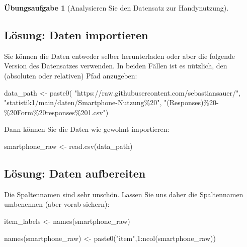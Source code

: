 \documentclass[
  letterpaper,
]{scrbook}
\newenvironment{Shaded}{\begin{snugshade}}{\end{snugshade}}
\newcommand{\DecValTok}[1]{\textcolor[rgb]{0.68,0.00,0.00}{#1}}
\newcommand{\FunctionTok}[1]{\textcolor[rgb]{0.28,0.35,0.67}{#1}}
\newcommand{\NormalTok}[1]{\textcolor[rgb]{0.00,0.23,0.31}{#1}}
\newcommand{\OtherTok}[1]{\textcolor[rgb]{0.00,0.23,0.31}{#1}}
\newcommand{\SpecialCharTok}[1]{\textcolor[rgb]{0.37,0.37,0.37}{#1}}
\newcommand{\StringTok}[1]{\textcolor[rgb]{0.13,0.47,0.30}{#1}}
\theoremstyle{definition}
\theoremstyle{definition}
\theoremstyle{definition}
\newtheorem{exercise}{Übungsaufgabe}[chapter]
\theoremstyle{remark}
\begin{document}
\begin{exercise}[Analysieren Sie den Datensatz zur
Handynutzung]
\subsection{Lösung: Daten
importieren}\label{luxf6sung-daten-importieren}

Sie können die Daten entweder selber herunterladen oder aber die
folgende Version des Datensatzes verwenden. In beiden Fällen ist es
nützlich, den (absoluten oder relativen) Pfad anzugeben:

\begin{Shaded}
\begin{Highlighting}[]
\NormalTok{data\_path }\OtherTok{\textless{}{-}} \FunctionTok{paste0}\NormalTok{(}
  \StringTok{"https://raw.githubusercontent.com/sebastiansauer/"}\NormalTok{,}
  \StringTok{"statistik1/main/daten/Smartphone{-}Nutzung\%20"}\NormalTok{,}
  \StringTok{"(Responses)\%20{-}\%20Form\%20responses\%201.csv"}\NormalTok{)}
\end{Highlighting}
\end{Shaded}

Dann können Sie die Daten wie gewohnt importieren:

\begin{Shaded}
\begin{Highlighting}[]
\NormalTok{smartphone\_raw }\OtherTok{\textless{}{-}} \FunctionTok{read.csv}\NormalTok{(data\_path)}
\end{Highlighting}
\end{Shaded}

\subsection{Lösung: Daten
aufbereiten}\label{luxf6sung-daten-aufbereiten}

Die Spaltennamen sind sehr unschön. Lassen Sie uns daher die
Spaltennamen umbenennen (aber vorab sichern):

\begin{Shaded}
\begin{Highlighting}[]
\NormalTok{item\_labels }\OtherTok{\textless{}{-}} \FunctionTok{names}\NormalTok{(smartphone\_raw)}

\FunctionTok{names}\NormalTok{(smartphone\_raw) }\OtherTok{\textless{}{-}} \FunctionTok{paste0}\NormalTok{(}\StringTok{"item"}\NormalTok{,}\DecValTok{1}\SpecialCharTok{:}\FunctionTok{ncol}\NormalTok{(smartphone\_raw))}
\end{Highlighting}
\end{Shaded}

\end{exercise}
\end{document}
